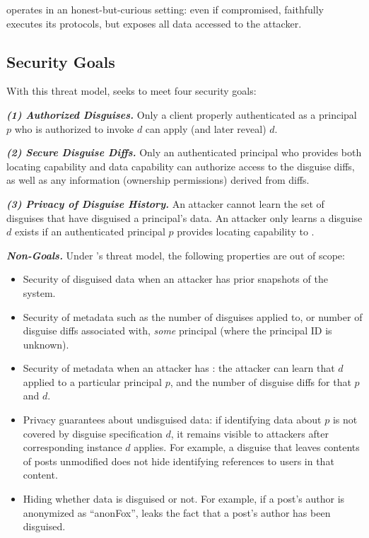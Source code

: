 %
\sys operates in an honest-but-curious setting: even if compromised, \sys faithfully executes
its protocols, but exposes all data accessed to the attacker.
%

\subsection{Security Goals}
%
With this threat model, \sys seeks to meet four security goals:
%

%
\vspace{6pt}\noindent\textbf{\emph{(1) Authorized Disguises.}}
%
Only a client properly authenticated as a principal $p$ who is authorized to invoke $d$ can apply
(and later reveal) $d$.
%

\vspace{6pt}\noindent\textbf{\emph{(2) Secure Disguise Diffs.}}
%
Only an authenticated principal who provides both locating capability  and data capability
 can authorize access to the disguise diffs, as well as any information
(\eg ownership permissions) derived from diffs.
%

\vspace{6pt}\noindent\textbf{\emph{(3) Privacy of Disguise History.}}
%
An attacker cannot learn the set of disguises that have disguised a principal's data.
%
An attacker only learns a disguise $d$ exists if an authenticated principal $p$ provides
locating capability  to \sys.

\vspace{6pt}\noindent\textbf{\emph{Non-Goals.}}
%
Under \sys's threat model, the following properties are out of scope:
%
\begin{itemize}
    \item Security of disguised data when an attacker has prior snapshots of the system.
    \item Security of metadata such as the number of disguises applied to, or number of
        disguise diffs associated with, \emph{some} principal (where the principal
        ID is unknown).
    \item Security of metadata when an attacker has : the attacker can learn that $d$
        applied to a particular principal $p$, and the number of disguise diffs for that $p$ and $d$.
    \item Privacy guarantees about undisguised data: if identifying data about $p$ is not covered by
        disguise specification $d$, it remains visible to attackers after corresponding instance $d$ applies.
        For example, a disguise that leaves contents of posts unmodified does not hide identifying references
	to users in that content.
    \item Hiding whether data is disguised or not. For example, if a post's author is anonymized as ``anonFox'',
        \sys leaks the fact that a post's author has been disguised.
\end{itemize}
